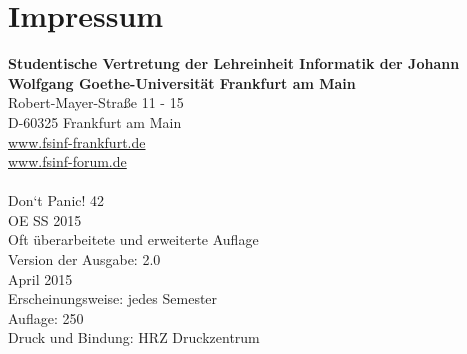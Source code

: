 \section{Impressum}
\spaltenanfang
\textbf{Studentische Vertretung der Lehreinheit Informatik der Johann Wolfgang Goethe-Universität Frankfurt am Main}\\
Robert-Mayer-Straße 11 - 15\\
D-60325 Frankfurt am Main\\
\url{www.fsinf-frankfurt.de}\\
\url{www.fsinf-forum.de}\\
\emailfachschaft\\
Don‘t Panic! 42\\
OE SS 2015\\
Oft überarbeitete und erweiterte Auflage\\
Version der Ausgabe: 2.0\\
April 2015\\
Erscheinungsweise: jedes Semester\\
Auflage: 250\\
Druck und Bindung: HRZ Druckzentrum

\spaltenende
